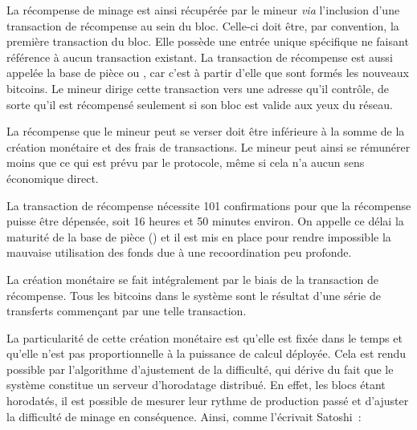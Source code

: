 La récompense de minage est ainsi récupérée par le mineur \emph{via} l'inclusion d'une transaction de récompense au sein du bloc. Celle-ci doit être, par convention, la première transaction du bloc. Elle possède une entrée unique spécifique ne faisant référence à aucun transaction existant. La transaction de récompense est aussi appelée la base de pièce ou , car c'est à partir d'elle que sont formés les nouveaux bitcoins. Le mineur dirige cette transaction vers une adresse qu'il contrôle, de sorte qu'il est récompensé seulement si son bloc est valide aux yeux du réseau.

La récompense que le mineur peut se verser doit être inférieure à la somme de la création monétaire et des frais de transactions. Le mineur peut ainsi se rémunérer moins que ce qui est prévu par le protocole, même si cela n'a aucun sens économique direct.

La transaction de récompense nécessite 101 confirmations pour que la récompense puisse être dépensée, soit 16 heures et 50 minutes environ. On appelle ce délai la maturité de la base de pièce () et il est mis en place pour rendre impossible la mauvaise utilisation des fonds due à une recoordination peu profonde.


La création monétaire se fait intégralement par le biais de la transaction de récompense. Tous les bitcoins dans le système sont le résultat d'une série de transferts commençant par une telle transaction.


La particularité de cette création monétaire est qu'elle est fixée dans le temps et qu'elle n'est pas proportionnelle à la puissance de calcul déployée. Cela est rendu possible par l'algorithme d'ajustement de la difficulté, qui dérive du fait que le système constitue un serveur d'horodatage distribué. En effet, les blocs étant horodatés, il est possible de mesurer leur rythme de production passé et d'ajuster la difficulté de minage en conséquence. Ainsi, comme l'écrivait Satoshi~:

